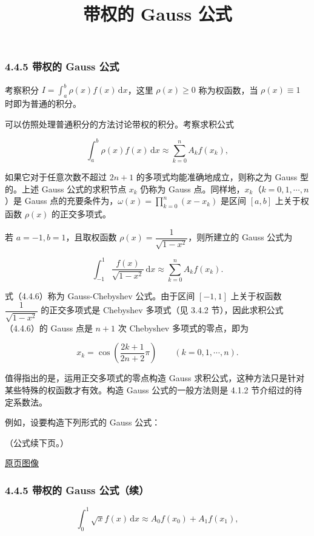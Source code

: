 \documentclass[
  10pt,
  fontset=fandol]{ctexart}
\title{带权的 Gauss 公式}
\author{}
\date{}
\begin{document}
\maketitle

\subsubsection{4.4.5 带权的 Gauss 公式}\label{ux5e26ux6743ux7684-gauss-ux516cux5f0f}

考察积分 \(\displaystyle I=\int_a^b\rho(x)f(x)\,\mathrm{d}x\)，这里 \(\rho(x)\geq0\) 称为权函数，当 \(\rho(x)\equiv1\) 时即为普通的积分。

可以仿照处理普通积分的方法讨论带权的积分。考察求积公式

\[
\int_a^b\rho(x)f(x)\,\mathrm{d}x\approx\sum_{k=0}^{n}A_kf(x_k),
\]

如果它对于任意次数不超过 \(2n+1\) 的多项式均能准确地成立，则称之为 Gauss 型的。上述 Gauss 公式的求积节点 \(x_k\) 仍称为 Gauss 点。同样地，\(x_k\)（\(k=0,1,\cdots,n\)）是 Gauss 点的充要条件为，\(\displaystyle\omega(x)=\prod_{k=0}^{n}(x-x_k)\) 是区间 \([a,b]\) 上关于权函数 \(\rho(x)\) 的正交多项式。

若 \(a=-1,b=1\)，且取权函数 \(\rho(x)=\dfrac1{\sqrt{1-x^2}}\)，则所建立的 Gauss 公式为

\[
\int_{-1}^{1}\frac{f(x)}{\sqrt{1-x^2}}\,\mathrm{d}x
\approx\sum_{k=0}^{n}A_kf(x_k).
\tag{4.4.6}
\]

式（4.4.6）称为 Gauss-Chebyshev 公式。由于区间 \([-1,1]\) 上关于权函数 \(\dfrac1{\sqrt{1-x^2}}\) 的正交多项式是 Chebyshev 多项式（见 3.4.2 节），因此求积公式（4.4.6）的 Gauss 点是 \(n+1\) 次 Chebyshev 多项式的零点，即为

\[
x_k=\cos\left(\frac{2k+1}{2n+2}\pi\right)\qquad(k=0,1,\cdots,n).
\]

值得指出的是，运用正交多项式的零点构造 Gauss 求积公式，这种方法只是针对某些特殊的权函数才有效。构造 Gauss 公式的一般方法则是 4.1.2 节介绍过的待定系数法。

例如，设要构造下列形式的 Gauss 公式：

（公式续下页。）

\href{../../source-images/pdf-111.jpeg}{原页图像}

\subsubsection{4.4.5 带权的 Gauss 公式（续）}\label{ux5e26ux6743ux7684-gauss-ux516cux5f0fux7eed}

\[
\int_0^1\sqrt{x}f(x)\,\mathrm{d}x\approx A_0f(x_0)+A_1f(x_1),
\tag{4.4.7}
\]
\end{document}
